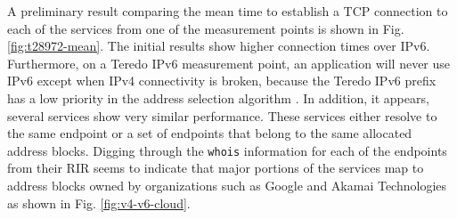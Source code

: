 
A preliminary result comparing the mean time to establish a TCP connection to
each of the services from one of the measurement points is shown in Fig.
\ref{fig:t28972-mean}. The initial results show higher connection times over
IPv6. Furthermore, on a Teredo IPv6 measurement point, an application will
never use IPv6 except when IPv4 connectivity is broken, because the Teredo
IPv6 prefix has a low priority in the address selection algorithm
\cite{rfc6724}. In addition, it appears, several services show very similar
performance. These services either resolve to the same endpoint or a set of
endpoints that belong to the same allocated address blocks. Digging through
the \texttt{whois} information for each of the endpoints from their \ac{RIR}
seems to indicate that major portions of the services map to address blocks
owned by organizations such as Google and Akamai Technologies as shown in Fig.
\ref{fig:v4-v6-cloud}.


